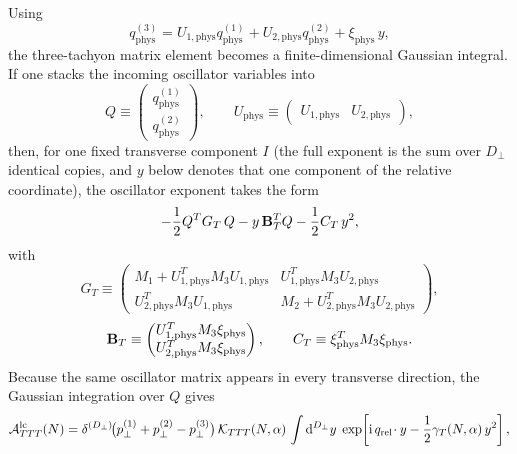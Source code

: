 \documentclass[11pt]{article}
\numberwithin{equation}{section}
\newcommand{\perpD}{D_\perp}
\newcommand{\ii}{\mathrm{i}}
\newcommand{\dd}{\mathrm{d}}
\begin{document}
Using
\begin{equation}
\label{eq:s12-1-008}
q_{\mathrm{phys}}^{(3)}
=
U_{1,\mathrm{phys}}q_{\mathrm{phys}}^{(1)}
+U_{2,\mathrm{phys}}q_{\mathrm{phys}}^{(2)}
+\xi_{\mathrm{phys}}\,y,
\end{equation}
the three-tachyon matrix element becomes a finite-dimensional Gaussian integral. If one stacks the incoming oscillator variables into
\begin{equation}
\label{eq:s12-1-009}
Q\equiv
\begin{pmatrix}
q_{\mathrm{phys}}^{(1)}\\
q_{\mathrm{phys}}^{(2)}
\end{pmatrix},
\qquad
U_{\mathrm{phys}}\equiv
\begin{pmatrix}
U_{1,\mathrm{phys}} & U_{2,\mathrm{phys}}
\end{pmatrix},
\end{equation}
then, for one fixed transverse component $I$ (the full exponent is the sum over $\perpD$ identical copies, and $y$ below denotes that one component of the relative coordinate), the oscillator exponent takes the form
\begin{equation}
\label{eq:s12-1-010}
-\frac12 Q^T G_T\,Q
-y\, {\bf B}_T^T Q
-\frac12 C_T\, y^2,
\end{equation}
with
\begin{equation}
\label{eq:s12-1-011}
G_T
\equiv
\begin{pmatrix}
M_1 + U_{1,\mathrm{phys}}^T M_3 U_{1,\mathrm{phys}} &
U_{1,\mathrm{phys}}^T M_3 U_{2,\mathrm{phys}}\\
U_{2,\mathrm{phys}}^T M_3 U_{1,\mathrm{phys}} &
M_2 + U_{2,\mathrm{phys}}^T M_3 U_{2,\mathrm{phys}}
\end{pmatrix},
\end{equation}
\begin{equation}
\label{eq:s12-1-012}
{\bf B}_T
\equiv
\begin{pmatrix}
U_{1,\mathrm{phys}}^T M_3 \xi_{\mathrm{phys}}\\
U_{2,\mathrm{phys}}^T M_3 \xi_{\mathrm{phys}}
\end{pmatrix},
\qquad
C_T \equiv \xi_{\mathrm{phys}}^T M_3 \xi_{\mathrm{phys}}.
\end{equation}
Because the same oscillator matrix appears in every transverse direction, the Gaussian integration over $Q$ gives
\begin{equation}
\label{eq:s12-1-013}
{\cal A}_{TTT}^{\mathrm{lc}}(N)
=
\delta^{(\perpD)}\!\bigl(p_\perp^{(1)}+p_\perp^{(2)}-p_\perp^{(3)}\bigr)\,
{\cal K}_{TTT}(N,\alpha)\,
\int \dd^{\perpD}y\;
\exp\!\left[
\ii\,q_{\mathrm{rel}}\!\cdot y
-\frac12 \gamma_T(N,\alpha)\,y^2
\right],
\end{equation}
\end{document}
